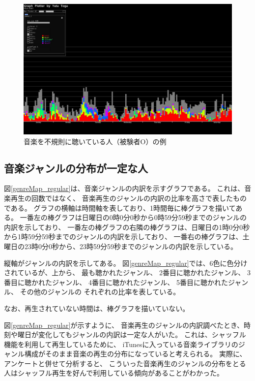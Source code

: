 \documentclass[11pt, onecolumn]{jsarticle}
\begin{document}
\begin{figure}[h]
\begin{center}
\includegraphics[width=14cm]{sample_irregular.jpg}
\caption{音楽を不規則に聴いている人（被験者O）の例}
\label{sample_irregular}
\end{center}
\end{figure}

\subsection{音楽ジャンルの分布が一定な人}
図\ref{genreMap_regular}は、音楽ジャンルの内訳を示すグラフである。
これは、音楽再生の回数ではなく、
音楽再生のジャンルの内訳の比率を高さで表したものである。
グラフの横軸は時間軸を表しており、1時間毎に棒グラフを描いてある。
一番左の棒グラフは日曜日の0時0分0秒から0時59分59秒までのジャンルの内訳を示しており、
一番左の棒グラフの右隣の棒グラフは、日曜日の1時0分0秒から1時59分59秒までのジャンルの内訳を示しており、
一番右の棒グラフは、土曜日の23時0分0秒から、23時59分59秒までのジャンルの内訳を示している。

縦軸がジャンルの内訳を示してある。
図\ref{genreMap_regular}では、6色に色分けされているが、上から、
最も聴かれたジャンル、
2番目に聴かれたジャンル、
3番目に聴かれたジャンル、
4番目に聴かれたジャンル、
5番目に聴かれたジャンル、
その他のジャンルの
それぞれの比率を表している。

なお、再生されていない時間は、棒グラフを描いていない。

図\ref{genreMap_regular}が示すように、
音楽再生のジャンルの内訳調べたとき、時刻や曜日が変化してもジャンルの内訳は一定な人がいた。
これは、シャッフル機能を利用して再生しているために、
iTunesに入っている音楽ライブラリのジャンル構成がそのまま音楽の再生の分布になっていると考えられる。
実際に、アンケートと併せて分析すると、
こういった音楽再生のジャンルの分布をとる人はシャッフル再生を好んで利用している傾向があることがわかった。
\end{document}
